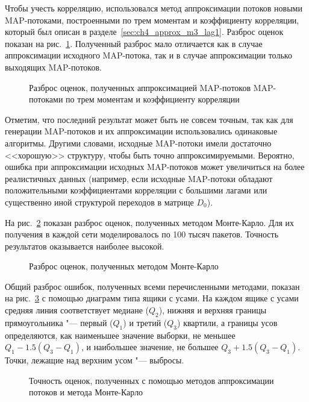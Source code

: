 Чтобы учесть корреляцию, использовался метод аппроксимации потоков новыми MAP-потоками, построенными по трем моментам и коэффициенту корреляции, который был описан в разделе~\ref{sec:ch4_approx_m3_lag1}. Разброс оценок показан на рис.~\ref{fig:ch4_scatter_map}. Полученный разброс мало отличается как в случае аппроксимации исходного MAP-потока, так и в случае аппроксимации только выходящих MAP-потоков.

\begin{figure}[h]
  \caption{Разброс оценок, полученных аппроксимацией MAP-потоков MAP-потоками по трем моментам и коэффициенту корреляции}
  \label{fig:ch4_scatter_map}
\end{figure}

Отметим, что последний результат может быть не совсем точным, так как для генерации MAP-потоков и их аппроксимации использовались одинаковые алгоритмы. Другими словами, исходные MAP-потоки имели достаточно <<хорошую>> структуру, чтобы быть точно аппроксимируемыми. Вероятно, ошибка при аппроксимации исходных MAP-потоков может увеличиться на более реалистичных данных (например, если исходные MAP-потоки обладают положительными коэффициентами корреляции с большими лагами или существенно иной структурой переходов в матрице $D_0$).

На рис.~\ref{fig:ch4_scatter_monte_carlo} показан разброс оценок, полученных методом Монте-Карло. Для их получения в каждой сети моделировалось по 100 тысяч пакетов. Точность результатов оказывается наиболее высокой.

\begin{figure}[h]
  \caption{Разброс оценок, полученных методом Монте-Карло}
  \label{fig:ch4_scatter_monte_carlo}
\end{figure}

Общий разброс ошибок, полученных всеми перечисленными методами, показан на рис.~\ref{fig:ch4_approximations_summary} с помощью диаграмм типа ящики с усами. На каждом ящике с усами средняя линия соответствует медиане ($Q_2$), нижняя и верхняя границы прямоугольника "--- первый ($Q_1$) и третий ($Q_3$) квартили, а границы усов определяются, как наименьшее значение выборки, не меньшее $Q_1 - 1.5 (Q_3 - Q_1)$, и наибольшее значение, не большее $Q_3 + 1.5 (Q_3 - Q_1)$. Точки, лежащие над верхним усом "--- выбросы.

\begin{figure}[!h]
  \caption{Точность оценок, полученных с помощью методов аппроксимации потоков и метода Монте-Карло}
  \label{fig:ch4_approximations_summary}
\end{figure}

